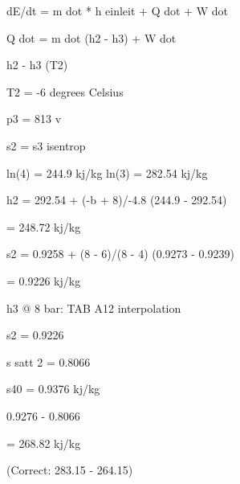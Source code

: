 dE/dt = m dot * h einleit + Q dot + W dot

Q dot = m dot (h2 - h3) + W dot

h2 - h3 (T2)

T2 = -6 degrees Celsius

p3 = 813 v

s2 = s3 isentrop

ln(4) = 244.9 kj/kg
ln(3) = 282.54 kj/kg

h2 = 292.54 + (-b + 8)/-4.8 (244.9 - 292.54)

= 248.72 kj/kg

s2 = 0.9258 + (8 - 6)/(8 - 4) (0.9273 - 0.9239)

= 0.9226 kj/kg

h3 @ 8 bar: TAB A12 interpolation

s2 = 0.9226

s satt 2 = 0.8066

s40 = 0.9376 kj/kg

0.9276 - 0.8066

= 268.82 kj/kg

(Correct: 283.15 - 264.15)